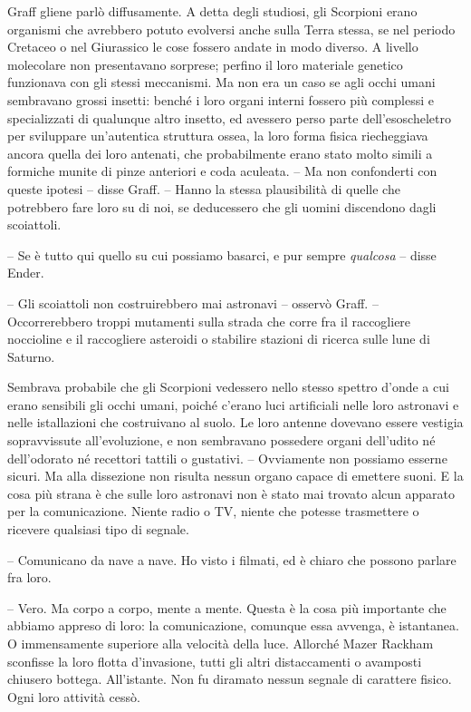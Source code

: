 {Graff gliene parlò diffusamente. A detta degli studiosi, gli Scorpioni
	erano organismi che avrebbero potuto evolversi anche sulla Terra stessa,
	se nel periodo Cretaceo o nel Giurassico le cose fossero andate in modo
	diverso. A livello molecolare non presentavano sorprese; perfino il loro
	materiale genetico funzionava con gli stessi meccanismi. Ma non era un
	caso se agli occhi umani sembravano grossi insetti: benché i loro organi
	interni fossero più complessi e specializzati di qualunque altro
	insetto, ed avessero perso parte dell'esoscheletro per sviluppare
	un'autentica struttura ossea, la loro forma fisica riecheggiava ancora
	quella dei loro antenati, che probabilmente erano stato molto simili a
	formiche munite di pinze anteriori e coda aculeata. -- Ma non
	confonderti con queste ipotesi -- disse Graff. -- Hanno la stessa
	plausibilità di quelle che potrebbero fare loro su di noi, se
	deducessero che gli uomini discendono dagli scoiattoli.}

{-- Se è tutto qui quello su cui possiamo basarci, e pur sempre
	\emph{qualcosa} -- disse Ender.}

{-- Gli scoiattoli non costruirebbero mai astronavi -- osservò Graff. --
	Occorrerebbero troppi mutamenti sulla strada che corre fra il
	raccogliere noccioline e il raccogliere asteroidi o stabilire stazioni
	di ricerca sulle lune di Saturno.}

{Sembrava probabile che gli Scorpioni vedessero nello stesso spettro
	d'onde a cui erano sensibili gli occhi umani, poiché c'erano luci
	artificiali nelle loro astronavi e nelle istallazioni che costruivano al
	suolo. Le loro antenne dovevano essere vestigia sopravvissute
	all'evoluzione, e non sembravano possedere organi dell'udito né
	dell'odorato né recettori tattili o gustativi. -- Ovviamente non
	possiamo esserne sicuri. Ma alla dissezione non risulta nessun organo
	capace di emettere suoni. E la cosa più strana è che sulle loro
	astronavi non è stato mai trovato alcun apparato per la comunicazione.
	Niente radio o TV, niente che potesse trasmettere o ricevere qualsiasi
	tipo di segnale.}

{-- Comunicano da nave a nave. Ho visto i filmati, ed è chiaro che
	possono parlare fra loro.}

{-- Vero. Ma corpo a corpo, mente a mente. Questa è la cosa più
	importante che abbiamo appreso di loro: la comunicazione, comunque essa
	avvenga, è istantanea. O immensamente superiore alla velocità della
	luce. Allorché Mazer Rackham sconfisse la loro flotta d'invasione, tutti
	gli altri distaccamenti o avamposti chiusero bottega. All'istante. Non
	fu diramato nessun segnale di carattere fisico. Ogni loro attività
	cessò.}

